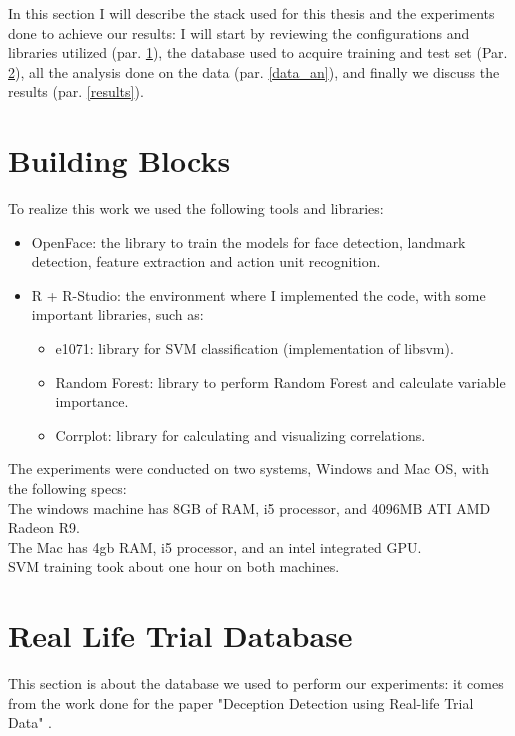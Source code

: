 In this section I will describe the stack used for this thesis and the experiments done to achieve our results: I will start by reviewing the configurations and libraries utilized (par. \ref{bb}), the database used to acquire training and test set (Par. \ref{rldb}), all the analysis done on the data (par. \ref{data_an}), and finally we discuss the results (par. \ref{results}).

\section{Building Blocks} \label{bb}
To realize this work we used the following tools and libraries:
\begin{itemize}
	\item OpenFace: the library to train the models for face detection, landmark detection, feature extraction and action unit recognition.
	\item R + R-Studio: the environment where I implemented the code, with some important libraries, such as:
	\begin{itemize}
		\item e1071: library for SVM classification (implementation of libsvm).
		\item Random Forest: library to perform Random Forest and calculate variable importance.
		\item Corrplot: library for calculating and visualizing correlations.
	\end{itemize}
\end{itemize}

The experiments were conducted on two systems, Windows and Mac OS, with the following specs:\\
The windows machine has 8GB of RAM, i5 processor, and 4096MB ATI AMD Radeon R9. \\
The Mac has 4gb RAM, i5 processor, and an intel integrated GPU.\\
SVM training took about one hour on both machines.

\clearpage

\section{Real Life Trial Database} \label{rldb}
This section is about the database we used to perform our experiments: it comes from the work done for the paper "Deception Detection using Real-life Trial Data" \cite{Perez-Rosas:2015:DDU:2818346.2820758}.

